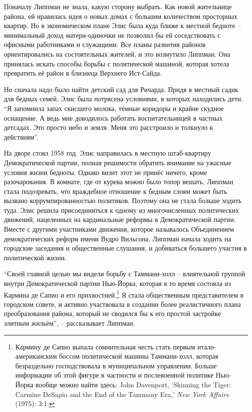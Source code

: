 Поначалу Липпман не знала, какую сторону выбрать. Как новой жительнице района, ей нравилась идея о новых домах с большим количеством просторных квартир. Но в экономическом плане Элис была куда ближе к местной бедноте -- минимальный доход матери-одиночки не позволил бы ей соседствовать с офисными работниками и служащими. Все планы развития районов ориентировались на состоятельных жителей, и это возмутило Липпман. Она принялась искать способы борьбы с политической машиной, которая хотела превратить её район в близнеца Верхнего Ист-Сайда.

Но сначала надо было найти детский сад для Ричарда. Придя в местный садик для бедных семей, Элис была потрясена условиями, в которых находились дети. \enquote{Я запомнила запах скисшего молока, тёмные коридоры и крайне скудное оснащение. А ведь мне доводилось работать воспитательницей в частных детсадах. Это просто небо и земля. Меня это расстроило и толкнуло к действиям}.

На дворе стоял 1958 год. Элис направилась в местную штаб-квартиру Демократической партии, полная решимости обратить внимание на ужасные условия жизни бедноты. Однако визит этот не принёс ничего, кроме разочарования. В комнате, где от курева можно было топор вешать, Липпман стала подозревать, что враждебное отношение к бедным слоям может быть вызвано коррумпированностью политиков. Поэтому она не стала больше ходить туда. Элис решила присоединиться к одному из многочисленных политических движений, нацеленных на кардинальные реформы в Демократической партии. Вместе с другими участниками движения, которое называлось Объединением демократических реформ имени Вудро Вильсона, Липпман начала ходить на городские заседания и общественные слушания, и добиваться большего участия в политической жизни.

\enquote{Своей главной целью мы видели борьбу с Таммани-холл -- влиятельной группой внутри Демократической партии Нью-Йорка, которая в то время состояла из Кармина де Сапио и его прихвостней.\footnote{Кармину де Сапио выпала сомнительная честь стать первым итало-американским боссом политической машины Таммани-холл, которая безраздельно господствовала в муниципальном управлении. Больше информации об этой фигуре в частности и послевоенной политике Нью-Йорка вообще можно найти здесь: John Davenport, \enquote{Skinning the Tiger: Carmine DeSapio and the End of the Tammany Era,} \textit{New York Affairs} (1975): 3:1.} Я стала общественным представителем в городском совете, и активно участвовала в создании более реалистичного плана преобразования района, который не сводился бы к его простой застройке элитным жильём}, -- рассказывает Липпман.

